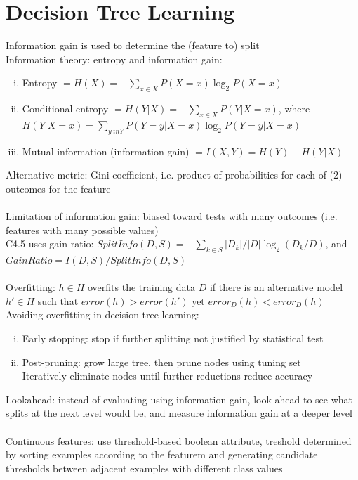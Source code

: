 \documentclass{article}
\begin{document}
	\section{Decision Tree Learning}
		Information gain is used to determine the (feature to) split \\
		Information theory: entropy and information gain:
		\begin{enumerate}[(i)]
			\item Entropy $= H(X) = -\sum_{x \in X}P(X = x)\log_2 P(X = x)$
			\item Conditional entropy $= H(Y|X) = -\sum_{x \in X}P(Y|X = x)$, where \\
			$H(Y|X = x) = \sum_{y \ in Y}P(Y = y|X = x)\log_2 P(Y = y|X = x)$
			\item Mutual information (information gain) $= I(X, Y) = H(Y) - H(Y|X)$
			\end{enumerate}
		Alternative metric: Gini coefficient, i.e. product of probabilities for each of (2) outcomes for the feature \\
		\\
		Limitation of information gain: biased toward tests with many outcomes (i.e. features with many possible values) \\
		C4.5 uses gain ratio: $SplitInfo(D, S) = -\sum_{k \in S} |D_k|/|D| \log_2(D_k/D)$, and $GainRatio = I(D, S)/SplitInfo(D, S)$ \\
		\\
		Overfitting: $h \in H$ overfits the training data $D$ if there is an alternative model $h' \in H$ such that $error(h) > error(h')$ yet $error_D(h) < error_D(h)$ \\
		Avoiding overfitting in decision tree learning:
		\begin{enumerate}[(i)]
			\item Early stopping: stop if further splitting not justified by statistical test
			\item Post-pruning: grow large tree, then prune nodes using tuning set \\
			Iteratively eliminate nodes until further reductions reduce accuracy
			\end{enumerate}
		Lookahead: instead of evaluating using information gain, look ahead to see what splits at the next level would be, and measure information gain at a deeper level \\
		\\
		Continuous features: use threshold-based boolean attribute, treshold determined by sorting examples according to the featurem and generating candidate thresholds between adjacent examples with different class values \\
\end{document}

